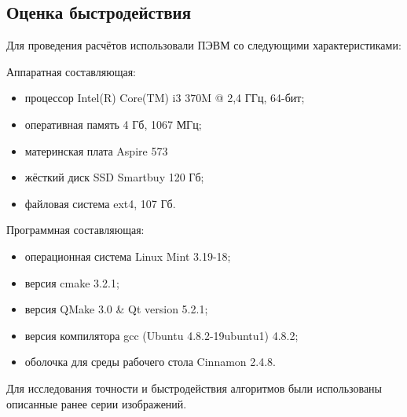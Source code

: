 \subsection {Оценка быстродействия}
Для проведения расчётов использовали ПЭВМ со следующими характеристиками:

Аппаратная составляющая:
\begin{itemize}
\item процессор Intel(R) Core(TM) i3 370M @ 2,4 ГГц, 64-бит;
\item оперативная память 4 Гб, 1067 МГц;
\item материнская плата Aspire 573
\item жёсткий диск SSD Smartbuy 120 Гб;
\item файловая система ext4, 107 Гб.
\end{itemize}

Программная составляющая:
\begin{itemize}
\item операционная система Linux Mint 3.19-18;
\item версия cmake 3.2.1;
\item версия QMake 3.0 \& Qt version 5.2.1;
\item версия компилятора gcc (Ubuntu 4.8.2-19ubuntu1) 4.8.2;
\item оболочка для среды рабочего стола Cinnamon 2.4.8.
\end{itemize}

Для исследования точности и быстродействия  алгоритмов были использованы описанные ранее серии изображений.